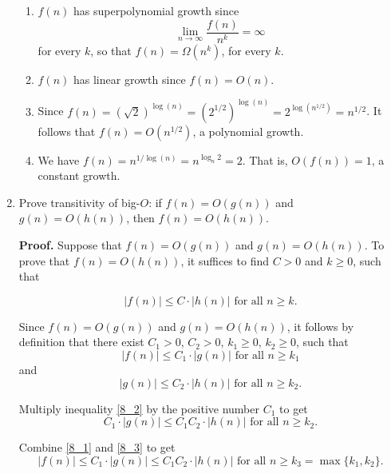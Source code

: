 \documentclass[9pt]{article}
\begin{document}
\begin{enumerate}
      \begin{enumerate}
         \item $f(n)$ has superpolynomial growth since
               $$\lim_{n\rightarrow\infty}\frac{f(n)}{n^k} = \infty$$
               for every $k$, so that $f(n) = \Omega(n^k)$, for every $k$.
         \item $f(n)$ has linear growth since $f(n) = O(n)$.
         \item Since $f(n) = (\sqrt{2})^{\log(n)} = (2^{1/2})^{\log(n)} =
                       2^{\log(n^{1/2})} = n^{1/2}$. It follows that
               $f(n) = O(n^{1/2})$, a polynomial growth.
         \item We have $f(n) = n^{1/\log(n)} = n^{\log_n2} = 2$. That is,
               $O(f(n)) = 1$, a constant growth.
      \end{enumerate}
   \item Prove transitivity of big-$O$: if $f(n) = O(g(n))$ and
         $g(n) = O(h(n))$, then $f(n) = O(h(n))$.

      \textbf{Proof.} Suppose that $f(n) = O(g(n))$ and $g(n) = O(h(n))$. To
      prove that ${f(n) = O(h(n))}$, it suffices to find $C > 0$ and $k \ge 0$,
      such that

      \begin{equation} \label{8_0}
         |f(n)| \le C \cdot |h(n)| \text{ for all } n \ge k.
      \end{equation}

      Since
      $f(n) = O(g(n))$ and $g(n) = O(h(n))$, it follows by definition that there
      exist $C_1 > 0$, $C_2 > 0$, $k_1 \ge 0$, $k_2 \ge 0$, such that
      \begin{equation} \label{8_1}
         |f(n)| \le C_1 \cdot |g(n)| \text{ for all } n \ge k_1
      \end{equation}
       and
      \begin{equation} \label{8_2}
         |g(n)| \le C_2 \cdot |h(n)| \text{ for all } n \ge k_2.
      \end{equation}

      Multiply inequality \eqref{8_2} by the positive number $C_1$ to get
      \begin{equation} \label{8_3}
         C_1 \cdot |g(n)| \le C_1C_2 \cdot |h(n)| \text{ for all } n \ge k_2.
      \end{equation}
      
      Combine \eqref{8_1} and \eqref{8_3} to get
      \begin{equation} \label{8_4}
         |f(n)| \le C_1 \cdot |g(n)| \le C_1C_2 \cdot |h(n)| \text{ for all }
         n \ge k_3 = \max\{k_1, k_2\}.
      \end{equation}


\end{enumerate}
\end{document}
